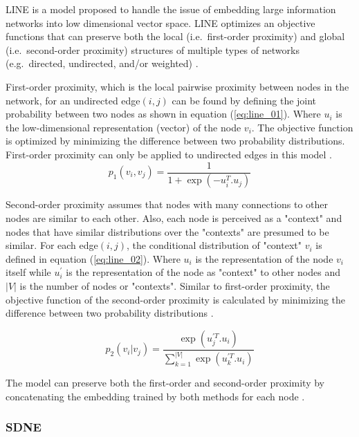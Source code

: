 \ac{LINE} is a model proposed to handle the issue of embedding large information networks into low dimensional vector space.
\ac{LINE} optimizes an objective functions that can preserve both the local (i.e.~first-order proximity) and global (i.e.~second-order proximity) structures of multiple types of networks (e.g.~directed, undirected, and/or weighted) \cite{tang_line:_2015}.

First-order proximity, which is the local pairwise proximity between nodes in the network, for an undirected edge$(i,j)$ can be found by defining the joint probability between two nodes as shown in equation (\ref{eq:line_01}).
Where $u_{i}$ is the low-dimensional representation (vector) of the node $v_{i}$.
The objective function is optimized by minimizing the difference between two probability distributions.
First-order proximity can only be applied to undirected edges in this model \cite{tang_line:_2015}.
\begin{equation} \label{eq:line_01}
p_{1}(v_{i}, v_{j}) = \frac{1}{1+ \exp{(-u_{i}^T .u_{j})}}
\end{equation}

Second-order proximity assumes that nodes with many connections to other nodes are similar to each other.
Also, each node is perceived as a "context" and nodes that have similar distributions over the "contexts" are presumed to be similar.
For each edge$(i,j)$, the conditional distribution of "context" $v_{i}$ is defined in equation (\ref{eq:line_02}).
Where $u_{i}$ is the representation of the node $v_{i}$ itself while $u_{i}^{'}$ is the representation of the node as "context" to other nodes and $|V|$ is the number of nodes or "contexts".
Similar to first-order proximity, the objective function of the second-order proximity is calculated by minimizing the difference between two probability distributions \cite{tang_line:_2015}.

\begin{equation} \label{eq:line_02}
p_{2}(v_{i}| v_{j}) = \frac{\exp(u_{j}^{'T} .u_{i})}{\sum_{k=1}^{|V|} \exp{(u_{k}^{'T} .u_{i})}}
\end{equation}

The model can preserve both the first-order and second-order proximity by concatenating the embedding trained by both methods for each node \cite{tang_line:_2015}.

\subsubsection{SDNE}\label{subsection:SDNE}

